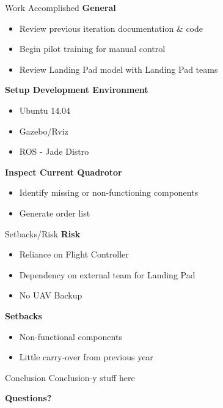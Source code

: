 \documentclass[11pt]{beamer}
\begin{document}
\begin{frame}{Work Accomplished}
\textbf{General}
\begin{itemize}
\item Review previous iteration documentation \& code
\item Begin pilot training for manual control
\item Review Landing Pad model with Landing Pad teams
\end{itemize}
\vspace{4mm}
\textbf{Setup Development Environment}
\begin{itemize}
\item Ubuntu 14.04
\item Gazebo/Rviz
\item ROS - Jade Distro
\end{itemize}
\vspace{4mm}
\textbf{Inspect Current Quadrotor}
\begin{itemize}
\item Identify missing or non-functioning components 
\item Generate order list
\end{itemize}
\end{frame}

\begin{frame}{Setbacks/Risk}
\textbf{Risk}
\begin{itemize}
\item Reliance on Flight Controller
\item Dependency on external team for Landing Pad
\item No UAV Backup
\end{itemize}
\vspace{6mm}
\textbf{Setbacks}
\begin{itemize}
\item Non-functional components
\item Little carry-over from previous year
\end{itemize}
\end{frame}

\begin{frame}{Conclusion}
Conclusion-y stuff here
\end{frame}

\begin{frame}
\center \Large{{\textbf{Questions?}}}
\end{frame}
\end{document}
